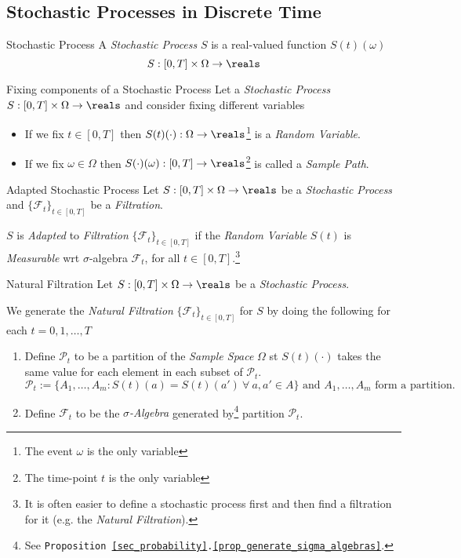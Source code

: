 \documentclass[11pt,a4paper]{article}
\begin{document}
\subsection{Stochastic Processes in Discrete Time}

  \begin{definition}{Stochastic Process}
    A \textit{Stochastic Process} $S$ is a real-valued function $S(t)(\omega)$
    \[ S:[0,T]\times\Omega\to\reals \]
  \end{definition}

  \begin{proposition}{Fixing components of a Stochastic Process}
    Let a \textit{Stochastic Process} $S:[0,T]\times\Omega\to\reals$ and consider fixing different variables
    \begin{itemize}
      \item If we fix $t\in[0,T]$ then $S(t)(\cdot):\Omega\to\reals$\footnote{The event $\omega$ is the only variable} is a \textit{Random Variable}.
      \item If we fix $\omega\in\Omega$ then $S(\cdot)(\omega):[0,T]\to\reals$\footnote{The time-point $t$ is the only variable} is called a \textit{Sample Path}.
    \end{itemize}
  \end{proposition}

  \begin{definition}{Adapted Stochastic Process}
    Let $S:[0,T]\times\Omega\to\reals$ be a \textit{Stochastic Process} and $\{\mathcal{F}_t\}_{t\in[0,T]}$ be a \textit{Filtration}.
    \par $S$ is \textit{Adapted} to \textit{Filtration} $\{\mathcal{F}_t\}_{t\in[0,T]}$ if the \textit{Random Variable} $S(t)$ is \textit{Measurable} wrt $\sigma$-algebra $\mathcal{F}_t$, for all $t\in[0,T]$.\footnote{It is often easier to define a stochastic process first and then find a filtration for it (e.g. the \textit{Natural Filtration}).}
  \end{definition}

  \begin{definition}{Natural Filtration}
    Let $S:[0,T]\times\Omega\to\reals$ be a \textit{Stochastic Process}.
    \par We generate the \textit{Natural Filtration} $\{\mathcal{F}_t\}_{t\in[0,T]}$ for $S$ by doing the following for each $t=0,1,\dots,T$
    \begin{enumerate}
      \item Define $\mathcal{P}_t$ to be a partition of the \textit{Sample Space} $\Omega$ st $S(t)(\cdot)$ takes the same value for each element in each subset of $\mathcal{P}_t$.
      \[ \mathcal{P}_t:=\big\{A_1,\dots,A_m:S(t)(a)=S(t)(a')\ \forall\ a,a'\in A\big\}\text{ and }A_1,\dots,A_m\text{ form a partition.} \]
      \item Define $\mathcal{F}_t$ to be the \textit{$\sigma$-Algebra} generated by\footnote{See \texttt{Proposition \ref{sec_probability}.\ref{prop_generate_sigma_algebras}}.} partition $\mathcal{P}_t$.
    \end{enumerate}
  \end{definition}
\end{document}
